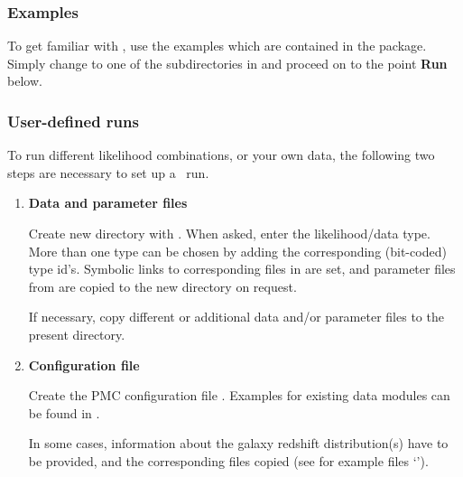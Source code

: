 

\subsubsection*{Examples}

To get familiar with \CosmoPMC, use the examples which are contained
in the package. Simply change to one of the subdirectories in
 and proceed on to the point
\textbf{Run} below.

\subsubsection*{User-defined runs}

To run different likelihood combinations, or your own data, the
following two steps are necessary to set up a \CosmoPMC\ run.

\begin{enumerate}

   \item \textbf{Data and parameter files}

     Create new directory with
     .  When
     asked, enter the likelihood/data type. More than one type can be
     chosen by adding the corresponding (bit-coded) type
     id's. Symbolic links to corresponding files in
      are set, and parameter files from
      are copied to the new directory
     on request.

     If necessary, copy different or additional data and/or parameter
     files to the present directory.


    \item \textbf{Configuration file}

      Create the PMC configuration file . Examples
      for existing data modules can be
      found in .

      In some cases, information about the galaxy redshift
      distribution(s) have to be provided, and the corresponding files
      copied (see  for example files
      `').

    \end{enumerate}


